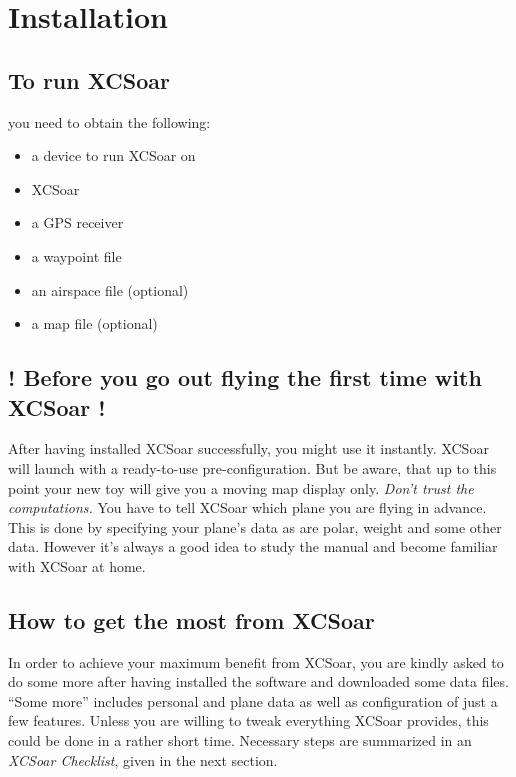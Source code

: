 \chapter{Installation}\label{cha:installation}

\section{To run XCSoar}
 you need to obtain the following:

\begin{itemize}
\itemsep0em
\item a device to run XCSoar on
\item XCSoar
\item a GPS receiver
\item a waypoint file
\item an airspace file (optional)
\item a map file (optional)
\end{itemize}

\section{! Before you go out flying the first time with XCSoar !}

After having installed XCSoar successfully, you might use it instantly. XCSoar 
will launch with a ready-to-use pre-configuration. But be aware, that up to 
this point your new toy will give you a moving map display only.
\warning \emph{Don't trust the computations.} You have to tell XCSoar which 
plane you are flying in advance.  This is done by specifying your plane's data 
as are polar, weight and some other data.  However it's always a good idea to 
study the manual and become familiar with XCSoar at home.

\section{How to get the most from XCSoar}

In order to achieve your maximum benefit from XCSoar, you are kindly asked to 
do some more after having installed the software and downloaded some data
files. ``Some more'' includes personal and plane data as well as configuration 
of just a few features. Unless you are willing to tweak everything XCSoar 
provides, this could be done in a rather short time. Necessary steps are 
summarized in an \emph{XCSoar Checklist}, given in the next section.

